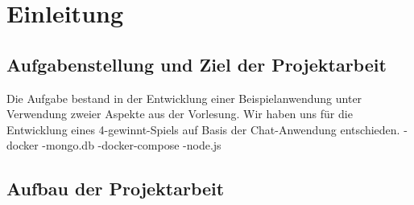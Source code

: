 
\chapter{Einleitung}\label{cha:Einleitung}

\section{Aufgabenstellung und Ziel der Projektarbeit}\label{sec:Aufgabenstellung}
Die Aufgabe bestand in der Entwicklung einer Beispielanwendung unter Verwendung zweier Aspekte aus der Vorlesung. Wir haben uns für die Entwicklung eines 4-gewinnt-Spiels auf Basis der Chat-Anwendung entschieden.
-docker
-mongo.db
-docker-compose
-node.js
\section{Aufbau der Projektarbeit}\label{sec:Aufbau}
